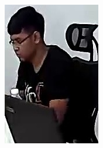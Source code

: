 \clearpage
\begin{figure}[!ht]
    \centering
    \begin{subfigure}[b]{0.2\textwidth}
        \centering
        \includegraphics[width=\textwidth]{chapter4/images/fei_0.jpg}
        \label{fig:ex_5}
    \end{subfigure}
    \begin{subfigure}[b]{0.2\textwidth}
        \centering

\end{subfigure}
\end{figure}
